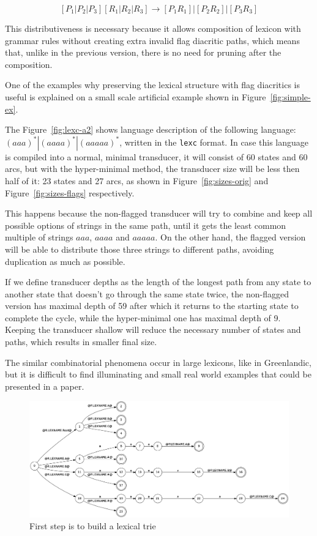 \documentclass[11pt]{article}
\begin{document}
\begin{equation}\label{hub_replacement}
[P_1 | P_2 | P_3] [R_1 | R_2 | R_3] \rightarrow [P_1 R_1] | [P_2 R_2] | [P_3 R_3]
\end{equation}



This distributiveness is necessary because it allows 
composition of lexicon with grammar rules without creating extra invalid flag diacritic paths, which means that, 
unlike in the previous version, there is no need for pruning after the composition.


One of the examples why preserving the lexical structure with flag diacritics is useful is explained on a small scale artificial example shown in 
Figure~\ref{fig:simple-ex}.
 
The Figure~\ref{fig:lexc-a2} shows language description of the following language: $(aaa)^*|(aaaa)^*|(aaaaa)^*$, written in 
the \texttt{lexc} format. In case this language is compiled into a normal, minimal transducer, it will consist of 60 states and 60 arcs, 
but with the hyper-minimal method, the transducer size will be less then half of it: 23 states and 27 arcs, as shown in 
Figure~\ref{fig:sizes-orig} and Figure~\ref{fig:sizes-flags} respectively.

This happens because the non-flagged transducer will try to combine and keep all possible options of strings in the same path, until it gets 
the least common multiple of strings $aaa$, $aaaa$ and $aaaaa$. On the other hand, the flagged version will be able to distribute those three 
strings to different paths, avoiding duplication as much as possible.

If we define transducer depths as the length of the longest path from any state to another state that doesn't go through the same state twice, 
the non-flagged version has maximal depth of 59 after which it returns to the starting state to complete the cycle, while the hyper-minimal 
one has maximal depth of 9. Keeping the transducer shallow will reduce the necessary number of states and paths, which results in smaller final size.

The similar combinatorial phenomena occur in large lexicons, like in Greenlandic, but it is difficult to find illuminating and small real 
world examples that could be presented in a paper.


\begin{figure}
    \includegraphics[width=\textwidth]{trie.png}
     \caption{First step is to build a lexical trie
     \label{fig:trie}}
\end{figure}
\end{document}
